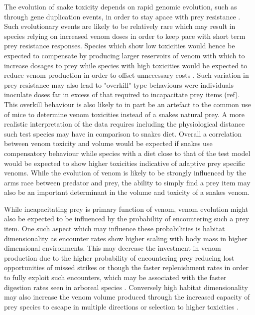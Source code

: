 The evolution of snake toxicity depends on rapid genomic evolution, such as through gene duplication events, in order to stay apace with prey resistance \citep{vonk2013king}. Such evolutionary events are likely to be relatively rare which may result in species relying on increased venom doses in order to keep pace with short term prey resistance responses. Species which show low toxicities would hence be expected to compensate by producing larger reservoirs of venom with which to increase dosages to prey while species with high toxicities would be expected to reduce venom production in order to offset unnecessary costs \citep{mccue2006cost}. Such variation in prey resistance may also lead to "overkill" type behaviours were individuals inoculate doses far in excess of that required to incapacitate prey items (ref). This overkill behaviour is also likely to in part be an artefact to the common use of mice to determine venom toxicities instead of a snakes natural prey. A more realistic interpretation of the data requires including the physiological distance such test species may have in comparison to snakes diet. Overall a correlation between venom toxicity and volume would be expected if snakes use compensatory behaviour while species with a diet close to that of the test model would be expected to show higher toxicities indicative of adaptive prey specific venoms. While the evolution of venom is likely to be strongly influenced by the arms race between predator and prey, the ability to simply find a prey item may also be an important determinant in the volume and toxicity of a snakes venom.


While incapacitating prey is primary function of venom, venom evolution might also be expected to be influenced by the probability of encountering such a prey item. One such aspect which may influence these probabilities is habitat dimensionality \citep{pawar2012dimensionality} as encounter rates show higher scaling with body mass in higher dimensional environments. This may decrease the investment in venom production due to the higher probability of encountering prey reducing lost opportunities of missed strikes or though the faster replenishment rates in order to fully exploit such encounters, which may be associated with the faster digestion rates seen in arboreal species \citep{lillywhite2002patterns}. Conversely high habitat dimensionality may also increase the venom volume produced through the increased capacity of prey species to escape in multiple directions or selection to higher toxicities \citep{healy2014ecology,moller2010up}. 


